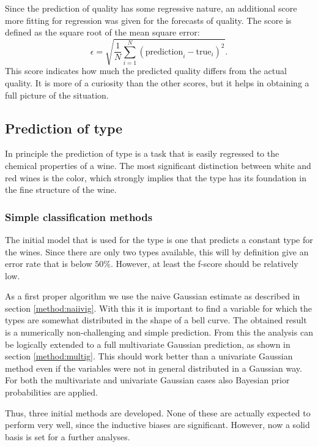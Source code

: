 \documentclass[twoside]{article}
\begin{document}
\begin{multicols}{2}
Since the prediction of quality has some regressive nature, an additional score more fitting for regression was given
for the forecasts of quality. The score is defined as the square root of the mean square error:
\begin{equation}\label{distmetric}
 \epsilon = \sqrt{\frac{1}{N} \sum_{i=1}^N ( \text{prediction}_i - \text{true}_i )^2 }.
\end{equation}
This score indicates how much the predicted quality differs from the actual quality. It is more of a curiosity than the other scores,
but it helps in obtaining a full picture of the situation.

\subsection{Prediction of type}

In principle the prediction of type is a task that is easily regressed to the chemical properties of a wine.
The most significant distinction between white and red wines is the color, which strongly implies that the type 
has its foundation in the fine structure of the wine.

\subsubsection{Simple classification methods}

The initial model that is used for the type is one that predicts a constant type for the wines. 
Since there are only two types available, this will by definition give an error rate that is below $50\%$. However,
at least the f-score should be relatively low.

As a first proper algorithm we use the naive Gaussian estimate as described in section \ref{method:naiivig}. With this it is
important to find a variable for which the types are somewhat distributed in the shape of a bell curve. The obtained 
result is a numerically non-challenging and simple prediction. From this the analysis can be logically extended to a full
multivariate Gaussian prediction, as shown in section \ref{method:multig}. This should work better than a univariate
Gaussian method even if the variables were not in general distributed in a Gaussian way. For both the multivariate
and univariate Gaussian cases also Bayesian prior probabilities are applied.

Thus, three initial methods are developed. None of these are actually expected to perform very well, since the inductive
biases are significant. However, now a solid basis is set for a further analyses.


\end{multicols}
\end{document}
